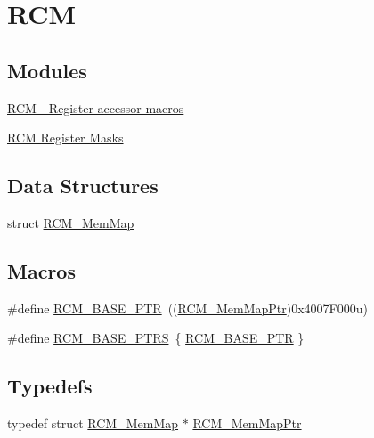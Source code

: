 \hypertarget{group___r_c_m___peripheral}{}\section{R\+CM}
\label{group___r_c_m___peripheral}
\subsection*{Modules}
\begin{DoxyCompactItemize}
\item 
\hyperlink{group___r_c_m___register___accessor___macros}{R\+C\+M -\/ Register accessor macros}
\item 
\hyperlink{group___r_c_m___register___masks}{R\+C\+M Register Masks}
\end{DoxyCompactItemize}
\subsection*{Data Structures}
\begin{DoxyCompactItemize}
\item 
struct \hyperlink{struct_r_c_m___mem_map}{R\+C\+M\+\_\+\+Mem\+Map}
\end{DoxyCompactItemize}
\subsection*{Macros}
\begin{DoxyCompactItemize}
\item 
\#define \hyperlink{group___r_c_m___peripheral_ga25ab3aa8d593d455ed36a52c77f88234}{R\+C\+M\+\_\+\+B\+A\+S\+E\+\_\+\+P\+TR}~((\hyperlink{group___r_c_m___peripheral_ga787b1c58d947f0b81c2502227dd0396b}{R\+C\+M\+\_\+\+Mem\+Map\+Ptr})0x4007\+F000u)
\item 
\#define \hyperlink{group___r_c_m___peripheral_gad8549fec4a09b0b485983beadfc3a5fb}{R\+C\+M\+\_\+\+B\+A\+S\+E\+\_\+\+P\+T\+RS}~\{ \hyperlink{group___r_c_m___peripheral_ga25ab3aa8d593d455ed36a52c77f88234}{R\+C\+M\+\_\+\+B\+A\+S\+E\+\_\+\+P\+TR} \}
\end{DoxyCompactItemize}
\subsection*{Typedefs}
\begin{DoxyCompactItemize}
\item 
typedef struct \hyperlink{struct_r_c_m___mem_map}{R\+C\+M\+\_\+\+Mem\+Map} $\ast$ \hyperlink{group___r_c_m___peripheral_ga787b1c58d947f0b81c2502227dd0396b}{R\+C\+M\+\_\+\+Mem\+Map\+Ptr}
\end{DoxyCompactItemize}


